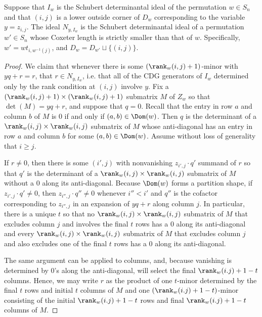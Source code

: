 \begin{lemma}\label{lem:SchubertDel}
Suppose that $I_w$ is the Schubert determinantal ideal of the permutation $w \in S_n$ and that $(i,j)$ is a lower outside corner of $D_w$ corresponding to the variable $y = z_{i,j}$.  The ideal $N_{y,I_w}$ is the Schubert determinantal ideal of a permutation $w' \in S_n$ whose Coxeter length is strictly smaller than that of $w$.  Specifically, $w' = wt_{i,w^{-1}(j)}$, and $D_w = D_{w'} \sqcup \{(i,j)\}$.  
\end{lemma}
\begin{proof}
We claim that whenever there is some $(\rank_w(i,j)+1)$-minor with $yq+r = r$, that $r \in N_{y,I_w}$, i.e. that all of the CDG generators of $I_w$ determined only by the rank condition at $(i,j)$ involve $y$.  Fix a $(\rank_w(i,j)+1) \times (\rank_w(i,j)+1)$ submatrix $M$ of $Z_w$ so that $\det(M) = yq+r$, and suppose that $q = 0$.  Recall that the entry in row $a$ and column $b$ of $M$ is $0$ if and only if $(a,b) \in \Dom(w)$.  Then $q$ is the determinant of a $\rank_w(i,j) \times \rank_w(i,j)$ submatrix of $M$ whose anti-diagonal has an entry in row $a$ and column $b$ for some $(a,b) \in \Dom(w)$.  Assume without loss of generality that $i \geq j$.  

If $r \neq 0$, then there is some $(i',j)$ with nonvanishing $z_{i',j} \cdot q'$  summand of $r$ so that $q'$ is the determinant of a $\rank_w(i,j) \times \rank_w(i,j)$ submatrix of $M$ without a $0$ along its anti-diagonal.  Because $\Dom(w)$ forms a partition shape, if $z_{i',j}\cdot q' \neq 0$, then $z_{i'',j} \cdot q'' \neq 0$ whenever $i''<i'$ and $q''$ is the cofactor corresponding to $z_{i'',j}$ in an expansion of $yq+r$ along column $j$.  In particular, there is a unique $t$ so that no $\rank_w(i,j) \times \rank_w(i,j)$ submatrix of $M$ that excludes column $j$ and involves the final $t$ rows has a $0$ along its anti-diagonal and every $\rank_w(i,j) \times \rank_w(i,j)$ submatrix of $M$ that excludes column $j$ and also excludes one of the final $t$ rows has a $0$ along its anti-diagonal.  

The same argument can be applied to columns, and, because vanishing is determined by $0$'s along the anti-diagonal, will select the final $\rank_w(i.j)+1-t$ columns.  Hence, we may write  $r$ as the product of one $t$-minor determined by the final $t$ rows and initial $t$ columns of $M$ and one $(\rank_w(i.j)+1-t)$-minor consisting of the initial $\rank_w(i.j)+1-t$ rows and final $\rank_w(i.j)+1-t$ columns of $M$.  


\end{proof}
